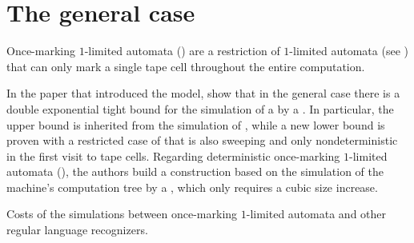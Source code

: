 \section{The general case}\label{sec:oncemarking-general}
Once-marking $1$-limited automata (\OMOLAs) are a restriction of $1$-limited automata (see ) that can only mark a single tape cell throughout the entire computation.

In the paper that introduced the model, \citeauthor{PigPri23a} show that in the general case there is a double exponential tight bound for the simulation of a \OMOLA by a \ODFA \cite{PigPri23a}.
In particular, the upper bound is inherited from the simulation of \OLAs, while a new lower bound is proven with a restricted case of \OMOLA that is also sweeping and only nondeterministic in the first visit to tape cells.
Regarding deterministic once-marking $1$-limited automata (\OMODLAs), the authors build a construction based on the simulation of the machine's computation tree by a \TDFA, which only requires a cubic size increase.

\begin{table}
	\centering
	\caption{Costs of the simulations between once-marking $1$-limited automata and other regular language recognizers.}
	\label{tab:sims-om-general-oncemarking}
\end{table}

